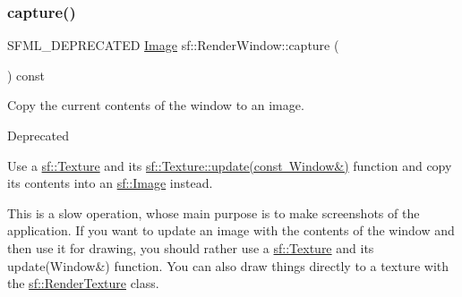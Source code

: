 \subsubsection{\texorpdfstring{capture()}{capture()}}
{\footnotesize\ttfamily S\+F\+M\+L\+\_\+\+D\+E\+P\+R\+E\+C\+A\+T\+ED \mbox{\hyperlink{classsf_1_1_image}{Image}} sf\+::\+Render\+Window\+::capture (\begin{DoxyParamCaption}{ }\end{DoxyParamCaption}) const}



Copy the current contents of the window to an image. 

\begin{DoxyRefDesc}{Deprecated}
\item[\mbox{\hyperlink{deprecated__deprecated000005}{Deprecated}}]Use a \mbox{\hyperlink{classsf_1_1_texture}{sf\+::\+Texture}} and its \mbox{\hyperlink{classsf_1_1_texture_ad3cceef238f7d5d2108a98dd38c17fc5}{sf\+::\+Texture\+::update(const Window\&)}} function and copy its contents into an \mbox{\hyperlink{classsf_1_1_image}{sf\+::\+Image}} instead. \end{DoxyRefDesc}

\begin{DoxyCode}{0}
\end{DoxyCode}


This is a slow operation, whose main purpose is to make screenshots of the application. If you want to update an image with the contents of the window and then use it for drawing, you should rather use a \mbox{\hyperlink{classsf_1_1_texture}{sf\+::\+Texture}} and its update(\+Window\&) function. You can also draw things directly to a texture with the \mbox{\hyperlink{classsf_1_1_render_texture}{sf\+::\+Render\+Texture}} class.

